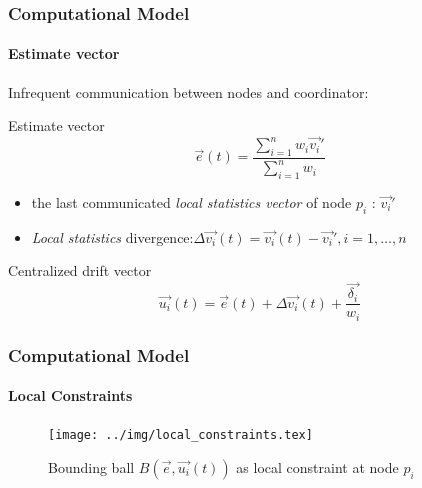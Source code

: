 \documentclass[hyperref={pdfpagelabels=false}]{beamer}
\begin{document}
\begin{frame} \frametitle{Computational Model}\framesubtitle{Estimate vector}
Infrequent communication between nodes and coordinator:
\begin{block}{Estimate vector}
\begin{equation*}
\vec{e}(t)=\frac{\sum_{i=1}^n {w_i \vec{v_i}'}}{\sum_{i=1}^n {w_i}}
\end{equation*}
\end{block}
\begin{itemize}
\item the last communicated \emph{local statistics vector} of node $p_i$ : $\vec{v_i}'$
\item \emph{Local statistics} divergence:$\Delta \vec{v_i}(t)=\vec{v_i}(t)-\vec{v_i}', i=1,\dots,n$
\end{itemize}
\begin{block}{Centralized drift vector}
\begin{equation*}
\vec{u_i}(t)=\vec{e}(t)+\Delta \vec{v_i}(t)+\frac{\vec{\delta_i}}{w_i}
\end{equation*} 
\end{block}
\end{frame}

\begin{frame} \frametitle{Computational Model}\framesubtitle{Local Constraints}
\begin{figure}[H]
\centering
\texttt{[image: ../img/local\_constraints.tex]}
\caption{Bounding ball $B(\vec{e}, \vec{u_i}(t))$ as local constraint at node $p_i$}
\end{figure}
\end{frame}
\end{document}
